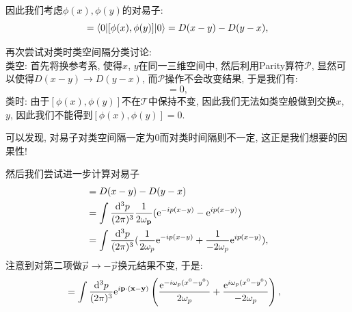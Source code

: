 
因此我们考虑$\phi(x), \phi(y)$的对易子:
\begin{equation}
    [\phi(x), \phi(y)]=\braket{0|[\phi(x), \phi(y)]|0}=D(x-y)-D(y-x),
\end{equation}

再次尝试对类时类空间隔分类讨论:\\
类空: 首先将换参考系, 使得$x$, $y$在同一三维空间中, 然后利用Parity算符$\mathcal P$, 显然可以使得$D(x-y)\rightarrow D(y-x)$, 而$\mathcal P$操作不会改变结果, 于是我们有:
\begin{equation}
    [\phi(x), \phi(y)]=0,
\end{equation}
类时: 由于$[\phi(x), \phi(y)]$不在$\mathcal T$中保持不变, 因此我们无法如类空般做到交换$x$, $y$, 因此我们不能得到$[\phi(x), \phi(y)]=0$.

可以发现, 对易子对类空间隔一定为0而对类时间隔则不一定, 这正是我们想要的因果性!

然后我们尝试进一步计算对易子
\begin{align}
    [\phi(x), \phi(y)]&=D(x-y)-D(y-x)\\
    &=\int\ld p(\exp{-ip(x-y)}-\exp{ip(x-y)})\\
    &=\int\ddd p(\frac1{2\omega_p}\exp{-ip(x-y)}+\frac1{-2\omega_p}\exp{ip(x-y)}),
\end{align}
注意到对第二项做$\vec p\rightarrow-\vec p$换元结果不变, 于是:
\begin{align}
    [\phi(x), \phi(y)]&=\int\ddd p\exp{i\vec p\cdot(\vec x-\vec y)}\left(\frac{\exp{-i\omega_p(x^0-y^0)}}{2\omega_p}+\frac{\exp{i\omega_p(x^0-y^0)}}{-2\omega_p}\right),
\end{align}

